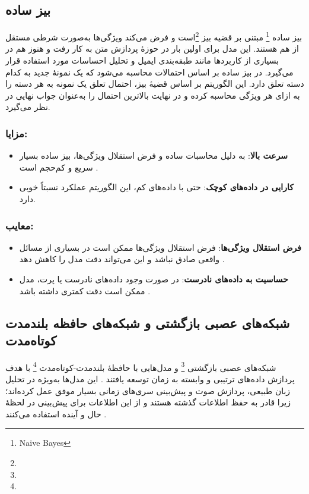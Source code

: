 \subsection{بیز ساده}
بیز ساده \footnote{Naive Bayes} مبتنی بر قضیه بیز \footnote{}است و فرض می‌کند ویژگی‌ها به‌صورت شرطی مستقل از هم هستند\cite{domingos1997optimal,mitchell1997machine}.
این مدل برای اولین بار در حوزهٔ پردازش متن به کار رفت و هنوز هم در بسیاری از کاربردها مانند طبقه‌بندی ایمیل و تحلیل احساسات مورد استفاده قرار می‌گیرد\cite{mccallum1998comparison}. 
در بیز ساده بر اساس احتمالات محاسبه می‌شود که یک نمونهٔ جدید به کدام دسته تعلق دارد. این الگوریتم بر اساس قضیهٔ بیز، احتمال تعلق یک نمونه به هر دسته را به ازای هر ویژگی محاسبه کرده و در نهایت بالاترین احتمال را به‌عنوان جواب نهایی در نظر می‌گیرد\cite{bishop2006pattern}.

\subsubsection{مزایا:}
\begin{itemize}
	\item \textbf{سرعت بالا}: به دلیل محاسبات ساده و فرض استقلال ویژگی‌ها، بیز ساده بسیار سریع و کم‌حجم است
	\cite{mccallum1998comparison}.
	\item \textbf{کارایی در داده‌های کوچک}: حتی با داده‌های کم، این الگوریتم عملکرد نسبتاً خوبی دارد\cite{murphy2012machine}.
\end{itemize}

\subsubsection{معایب:}
\begin{itemize}
	\item \textbf{فرض استقلال ویژگی‌ها}: فرض استقلال ویژگی‌ها ممکن است در بسیاری از مسائل واقعی صادق نباشد و این می‌تواند دقت مدل را کاهش دهد
	\cite{domingos1997optimal}.
	\item \textbf{حساسیت به داده‌های نادرست}: در صورت وجود داده‌های نادرست یا پرت، مدل ممکن است دقت کمتری داشته باشد
	\cite{bishop2006pattern}.
\end{itemize}


\subsection{شبکه‌های عصبی بازگشتی و شبکه‌های حافظه بلندمدت کوتاه‌مدت}
شبکه‌های عصبی بازگشتی \footnote{} و مدل‌هایی با حافظهٔ بلندمدت-کوتاه‌مدت \footnote{} با هدف پردازش داده‌های ترتیبی و وابسته به زمان توسعه یافتند
\cite{rumelhart1986learning,hochreiter1997long}.
این مدل‌ها به‌ویژه در تحلیل زبان طبیعی، پردازش صوت و پیش‌بینی سری‌های زمانی بسیار موفق عمل کرده‌اند؛ زیرا قادر به حفظ اطلاعات گذشته هستند و از این اطلاعات برای پیش‌بینی در لحظهٔ حال و آینده استفاده می‌کنند
\cite{gers1999learning}.

